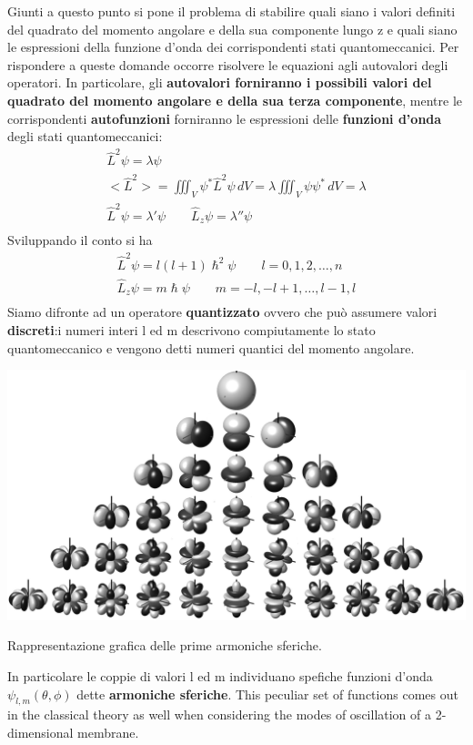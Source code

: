 Giunti a questo punto si pone il problema di stabilire quali siano i
valori definiti del quadrato del momento angolare e della sua componente
lungo z e quali siano le espressioni della funzione d'onda dei
corrispondenti stati quantomeccanici.
Per rispondere a queste domande
occorre risolvere le equazioni agli autovalori degli operatori.
In
particolare, gli \textbf{autovalori forniranno i possibili valori del
	quadrato del momento angolare e della sua terza componente}, mentre le
corrispondenti \textbf{autofunzioni} forniranno le espressioni delle
\textbf{funzioni d'onda} degli stati quantomeccanici: \begin{gather*}
	\hat{L}^{2}\psi = \lambda \psi\\
	< \hat{L}^{2}> = \iiint_{V} \psi^{*} \hat{L}^{2}\psi \, dV = \lambda \iiint_{V} \psi \psi^{*} \, dV = \lambda\\
	\hat{L}^{2} \psi = \lambda' \psi \qquad  \hat{L}_{z} \psi = \lambda'' \psi\\
\end{gather*} Sviluppando il conto si ha \begin{gather*}
	\hat{L}^{2}\psi = l(l+1) \hslash^{2} \psi \qquad l = 0,1,2, \dots , n\\
	\hat{L}_{z} \psi = m \hslash \psi \qquad m = -l,-l + 1, \dots ,l-1, l\\
\end{gather*} Siamo difronte ad un operatore \textbf{quantizzato} ovvero che può
assumere valori \textbf{discreti}:i numeri interi l ed m descrivono
compiutamente lo stato quantomeccanico e vengono detti numeri quantici
del momento angolare.\\
\begin{marginfigure}
	\includegraphics{figs/spherical-harmonics}
	\caption{Rappresentazione grafica delle prime armoniche sferiche.}
	\label{fig:spherical-harmonics}
\end{marginfigure}
In particolare le coppie di valori l ed m individuano spefiche funzioni
d'onda \(\psi_{l,m}(\theta,\phi)\) dette \textbf{armoniche sferiche}.
This peculiar set of functions comes out in the classical theory as well
when considering the modes of oscillation of a 2-dimensional membrane.

